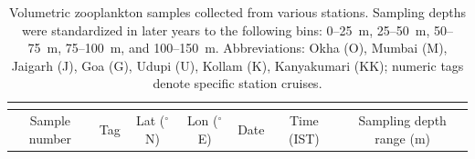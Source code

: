 \documentclass[authoryear,review,11pt]{elsarticle}
\begin{document}
\newpage
\renewcommand{\baselinestretch}{0.98}
\setlongtables
	\begin{scriptsize}
	\begin{longtable}{ccccccc}
		\caption{Volumetric zooplankton samples collected from various stations. Sampling depths were standardized in later years to the following bins: 0--25~m, 25--50~m, 50--75~m, 75--100~m, and 100--150~m. Abbreviations: Okha (O), Mumbai (M), Jaigarh (J), Goa (G), Udupi (U), Kollam (K), Kanyakumari (KK); numeric tags denote specific station cruises.} \\
		\label{tab:mpn} \\
		
		\toprule
		Sample number & Tag & Lat ($^{\circ}$N) & Lon ($^{\circ}$E) & Date & Time (IST) & Sampling depth range (m) \\
		\midrule[1.05pt]
		

\end{longtable}
\end{scriptsize}
\end{document}
